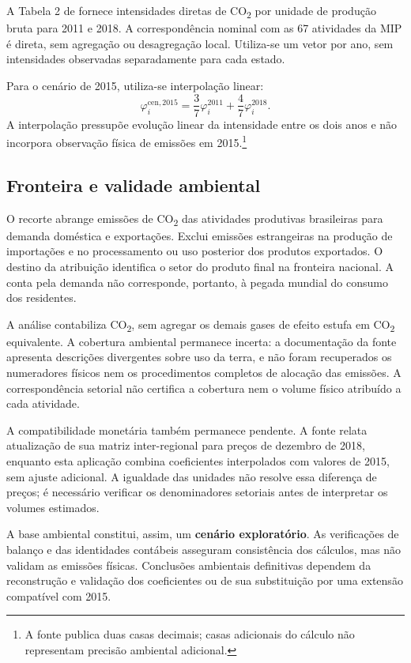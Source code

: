 A Tabela 2 de \textcite{sanguinetAzzoni2024} fornece intensidades diretas de CO\textsubscript{2} por unidade de produção bruta para 2011 e 2018. A correspondência nominal com as 67 atividades da MIP é direta, sem agregação ou desagregação local. Utiliza-se um vetor por ano, sem intensidades observadas separadamente para cada estado.

Para o cenário de 2015, utiliza-se interpolação linear:
\begin{equation}
\varphi_i^{\mathrm{cen},2015}=\frac{3}{7}\varphi_i^{2011}+\frac{4}{7}\varphi_i^{2018}.
\label{eq:coeficiente-cenario}
\end{equation}
A interpolação pressupõe evolução linear da intensidade entre os dois anos e não incorpora observação física de emissões em 2015.\footnote{A fonte publica duas casas decimais; casas adicionais do cálculo não representam precisão ambiental adicional.}

\subsection{Fronteira e validade ambiental}

O recorte abrange emissões de CO\textsubscript{2} das atividades produtivas brasileiras para demanda doméstica e exportações. Exclui emissões estrangeiras na produção de importações e no processamento ou uso posterior dos produtos exportados. O destino da atribuição identifica o setor do produto final na fronteira nacional. A conta pela demanda não corresponde, portanto, à pegada mundial do consumo dos residentes.

A análise contabiliza CO\textsubscript{2}, sem agregar os demais gases de efeito estufa em CO\textsubscript{2} equivalente. A cobertura ambiental permanece incerta: a documentação da fonte apresenta descrições divergentes sobre uso da terra, e não foram recuperados os numeradores físicos nem os procedimentos completos de alocação das emissões. A correspondência setorial não certifica a cobertura nem o volume físico atribuído a cada atividade.

A compatibilidade monetária também permanece pendente. A fonte relata atualização de sua matriz inter-regional para preços de dezembro de 2018, enquanto esta aplicação combina coeficientes interpolados com valores de 2015, sem ajuste adicional. A igualdade das unidades não resolve essa diferença de preços; é necessário verificar os denominadores setoriais antes de interpretar os volumes estimados.

A base ambiental constitui, assim, um \textbf{cenário exploratório}. As verificações de balanço e das identidades contábeis asseguram consistência dos cálculos, mas não validam as emissões físicas. Conclusões ambientais definitivas dependem da reconstrução e validação dos coeficientes ou de sua substituição por uma extensão compatível com 2015.